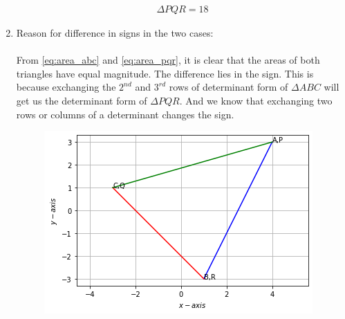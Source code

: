 \documentclass[journal,12pt,twocolumn]{IEEEtran}
\renewcommand\thesection{\arabic{section}}
\begin{document}
\begin{enumerate}[label=\thesection.\arabic*.,ref=\thesection.\theenumi]
\begin{align}
\label{eq:area_pqr}
\Delta PQR=18    
\end{align}
\item Reason for difference in signs in the two cases:
\\\\
From \eqref{eq:area_abc} and \eqref{eq:area_pqr}, it is clear that the areas of both triangles have equal magnitude. The difference lies in the sign. This is because exchanging the $2^{nd}$ and $3^{rd}$ rows of determinant form of $\Delta ABC$ will get us the determinant form of $\Delta PQR$. And we know that exchanging two rows or columns of a determinant changes the sign.
\begin{figure}[!ht]
	\centering
	\includegraphics[width=\columnwidth]{triangle.png}
\end{figure}
\end{enumerate}
\end{document}
